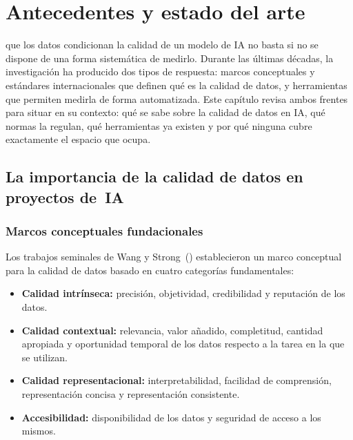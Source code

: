 \chapter{Antecedentes y estado del arte}
\label{chap:antecedentes}

 que los datos condicionan la calidad de un modelo de \ac{IA} no
basta si no se dispone de una forma sistemática de medirlo.  Durante las
últimas décadas, la investigación ha producido dos tipos de respuesta: marcos
conceptuales y estándares internacionales que definen qué es la calidad de
datos, y herramientas que permiten medirla de forma automatizada.  Este capítulo
revisa ambos frentes para situar \dataqual en su contexto: qué se sabe sobre
la calidad de datos en \ac{IA}, qué normas la regulan, qué herramientas ya
existen y por qué ninguna cubre exactamente el espacio que \dataqual ocupa.


\section[Importancia de la calidad de datos en IA]{La importancia de la calidad de datos en proyectos de~\ac{IA}}
\label{sec:importancia-calidad}

\subsection{Marcos conceptuales fundacionales}

Los trabajos seminales de Wang y Strong~(\citeyear{wang1996}) establecieron un marco
conceptual para la calidad de datos basado en cuatro categorías fundamentales:

\begin{itemize}
  \item \textbf{Calidad intrínseca:} precisión, objetividad, credibilidad y
    reputación de los datos.
  \item \textbf{Calidad contextual:} relevancia, valor añadido, completitud,
    cantidad apropiada y oportunidad temporal de los datos respecto a la tarea
    en la que se utilizan.
  \item \textbf{Calidad representacional:} interpretabilidad, facilidad de
    comprensión, representación concisa y representación consistente.
  \item \textbf{Accesibilidad:} disponibilidad de los datos y seguridad de
    acceso a los mismos.
\end{itemize}

